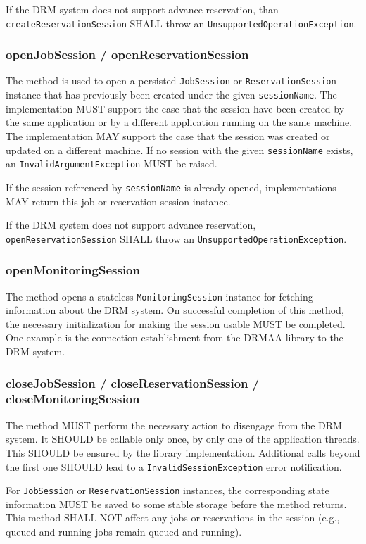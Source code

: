\documentclass{article}
\newcommand{\h}[1]{\lstinline|#1|}
\begin{document}
If the DRM system does not support advance reservation, than \h{createReservationSession} SHALL throw an \h{UnsupportedOperationException}.

\subsubsection{openJobSession / openReservationSession}

The method is used to open a persisted \h{JobSession} or \h{ReservationSession} instance that has previously been created under the given \h{sessionName}. The implementation MUST support the case that the session have been created by the same application or by a different application running on the same machine. The implementation MAY support the case that the session was created or updated on a different machine. If no session with the given \h{sessionName} exists, an \h{InvalidArgumentException} MUST be raised.

If the session referenced by \h{sessionName} is already opened, implementations MAY return this job or reservation session instance.

If the DRM system does not support advance reservation, \h{openReservationSession} SHALL throw an \h{UnsupportedOperationException}.

\subsubsection{openMonitoringSession}

The method opens a stateless \h{MonitoringSession} instance for fetching information about the DRM system. On successful completion of this method, the necessary initialization for making the session usable MUST be completed. One example is the connection establishment from the DRMAA library to the DRM system.

\subsubsection{closeJobSession / closeReservationSession / closeMonitoringSession}

The method MUST perform the necessary action to disengage from the DRM system. It SHOULD be callable only once, by only one of the application threads. This SHOULD be ensured by the library implementation. Additional calls beyond the first one SHOULD lead to a \h{InvalidSessionException} error notification.

For \h{JobSession} or \h{ReservationSession} instances, the corresponding state information MUST be saved to some stable storage before the method returns. This method SHALL NOT affect any jobs or reservations in the session (e.g., queued and running jobs remain queued and running).
\end{document}
